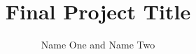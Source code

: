 \documentclass[runningheads]{llncs}
\begin{document}
\pagestyle{headings}
\mainmatter
\def\ECCV16SubNumber{***}  %

\title{Final Project Title} %


\author{Name One and Name Two}

\maketitle










\end{document}
